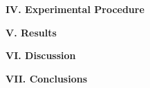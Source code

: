 \documentclass[fleqn]{article}
\begin{document}
  
  \vspace{20px}




  \textbf{IV. Experimental Procedure}

  \vspace{10px}

  
  \vspace{20px}





  \textbf{V. Results}

  \vspace{10px}

  
  \vspace{20px}




  \textbf{VI. Discussion}

  \vspace{10px}

  
  \vspace{20px}



  \textbf{VII. Conclusions}

  \vspace{10px}

  
  \vspace{20px}

  \printbibliography
\end{document}
